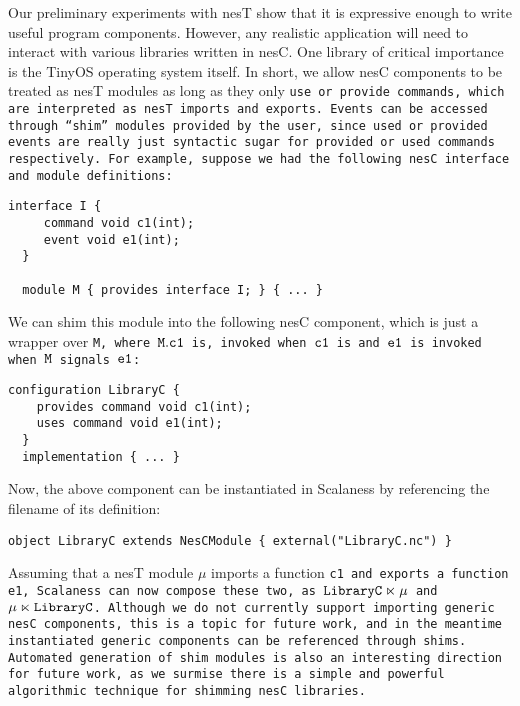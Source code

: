 Our preliminary experiments with nesT show that it is expressive enough to write useful program
components. However, any realistic application will need to interact with various libraries
written in nesC. One library of critical importance is the TinyOS operating system itself. In
short, we allow nesC components to be treated as nesT modules as long as they only \tt{use} or
\tt{provide} commands, which are interpreted as nesT imports and exports. Events can be accessed
through ``shim'' modules provided by the user, since used or provided events are really just
syntactic sugar for provided or used commands respectively. For example, suppose we had the
following nesC interface and module definitions:
\begin{Verbatim}[fontfamily=cmtt,fontsize=\scriptsize]
  interface I {
     command void c1(int);
     event void e1(int);
  }

  module M { provides interface I; } { ... }
\end{Verbatim}
We can shim this module into the following nesC component, which is just a wrapper over \tt{M},
where $\tt{M.c1}$ is, invoked when $\tt{c1}$ is and $\tt{e1}$ is invoked when $\tt{M}$ signals
$\tt{e1}$:
\begin{Verbatim}[fontfamily=cmtt,fontsize=\scriptsize]
  configuration LibraryC {
    provides command void c1(int);
    uses command void e1(int);
  }
  implementation { ... }
\end{Verbatim}
Now, the above component can be instantiated in Scalaness by referencing the filename of its
definition:
\begin{Verbatim}[fontfamily=cmtt,fontsize=\scriptsize]
  object LibraryC extends NesCModule { external("LibraryC.nc") }
\end{Verbatim}
Assuming that a nesT module $\mu$ imports a function \tt{c1} and exports a function \tt{e1},
Scalaness can now compose these two, as $\tt{LibraryC} \ltimes \mu$ and $\mu \ltimes
\tt{LibraryC}$. Although we do not currently support importing generic nesC components, this is
a topic for future work, and in the meantime instantiated generic components can be referenced
through shims. Automated generation of shim modules is also an interesting direction for future
work, as we surmise there is a simple and powerful algorithmic technique for shimming nesC
libraries.


%

